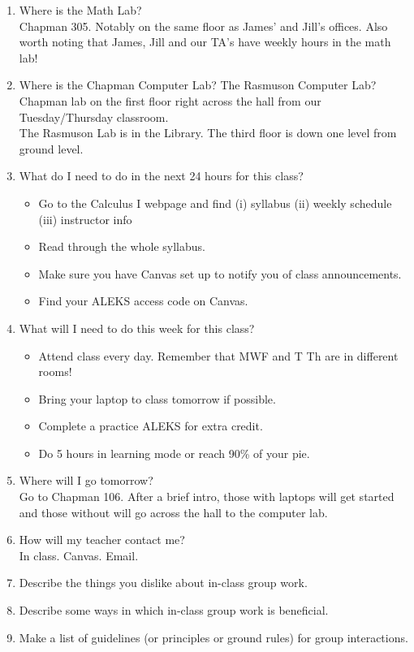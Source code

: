 \documentclass[11pt,fleqn]{article}
\begin{document}
\begin{enumerate}
\item Where is the Math Lab?\\
Chapman 305. Notably on the same floor as James' and Jill's offices. Also worth noting that James, Jill and our TA's have weekly hours in the math lab!
\vfill

\item Where is the Chapman Computer Lab? The Rasmuson Computer Lab?\\
Chapman lab on the first floor right across the hall from our Tuesday/Thursday classroom.\\
The Rasmuson Lab is in the Library. The third floor is down one level from ground level.
\vfill

\item What do I need to do in the next 24 hours for this class?\\
\begin{itemize}
\item Go to the Calculus I webpage and find (i) syllabus (ii) weekly schedule (iii) instructor info
\item Read through the whole syllabus.
\item Make sure you have Canvas set up to notify you of class announcements.
\item Find your ALEKS access code on Canvas.
\end{itemize}
\vfill
\item What will I need to do this week for this class?\\
\begin{itemize}
\item Attend class every day. Remember that MWF and T Th are in different rooms!
\item Bring your laptop to class tomorrow if possible.
\item Complete a practice ALEKS for extra credit.
\item Do 5 hours in learning mode or reach 90\% of your pie.
\end{itemize}
\vfill
\item Where will I go tomorrow?\\
Go to Chapman 106. After a brief intro, those with laptops will get started and those without will go across the hall to the computer lab.
\vfill
\item How will my teacher contact me? \\
In class. Canvas. Email.
\vfill
\item Describe the things you dislike about in-class group work.
\vfill
\item Describe some ways in which in-class group work is beneficial.
\vfill
\item Make a list of guidelines (or principles or ground rules) for group interactions. 
\vfill


\end{enumerate}
\end{document}
